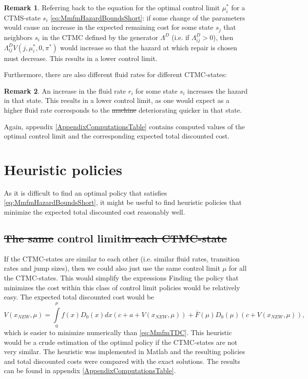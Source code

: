 \documentclass[a4paper]{thesis}
\theoremstyle{definition}
\newtheorem{remark}{Remark}[chapter]
\providecommand{\DIFaddtex}[1]{{\protect\color{blue}\uwave{#1}}} %
\providecommand{\DIFdeltex}[1]{{\protect\color{red}\sout{#1}}}                      %
\providecommand{\DIFaddbegin}{} %
\providecommand{\DIFaddend}{} %
\providecommand{\DIFdelbegin}{} %
\providecommand{\DIFdelend}{} %
\providecommand{\DIFadd}[1]{\texorpdfstring{\DIFaddtex{#1}}{#1}} %
\providecommand{\DIFdel}[1]{\texorpdfstring{\DIFdeltex{#1}}{}} %
\newcommand{\DIFscaledelfig}{0.5}
\newlength{\DIFdelgraphicswidth} %
\newlength{\DIFdelgraphicsheight} %
\newcommand{\DIFaddincludegraphics}[2][]{{\color{blue}\fbox{\DIFOincludegraphics[#1]{#2}}}} %
\newcommand{\DIFdelincludegraphics}[2][]{%
	\sbox{\DIFdelgraphicsbox}{\DIFOincludegraphics[#1]{#2}}%
	\settoboxwidth{\DIFdelgraphicswidth}{\DIFdelgraphicsbox} %
	\settoboxtotalheight{\DIFdelgraphicsheight}{\DIFdelgraphicsbox} %
	\scalebox{\DIFscaledelfig}{%
		\parbox[b]{\DIFdelgraphicswidth}{\usebox{\DIFdelgraphicsbox}\\[-\baselineskip] \rule{\DIFdelgraphicswidth}{0em}}\llap{\resizebox{\DIFdelgraphicswidth}{\DIFdelgraphicsheight}{%
				\setlength{\unitlength}{\DIFdelgraphicswidth}%
				\begin{picture}(1,1)%
				\thicklines\linethickness{2pt} %
				{\color[rgb]{1,0,0}\put(0,0){\framebox(1,1){}}}%
				{\color[rgb]{1,0,0}\put(0,0){\line( 1,1){1}}}%
				{\color[rgb]{1,0,0}\put(0,1){\line(1,-1){1}}}%
				\end{picture}%
			}\hspace*{3pt}}} %
} %
\DeclareRobustCommand{\DIFaddbegin}{\DIFOaddbegin \let\includegraphics\DIFaddincludegraphics} %
\DeclareRobustCommand{\DIFaddend}{\DIFOaddend \let\includegraphics\DIFOincludegraphics} %
\DeclareRobustCommand{\DIFdelbegin}{\DIFOdelbegin \let\includegraphics\DIFdelincludegraphics} %
\DeclareRobustCommand{\DIFdelend}{\DIFOaddend \let\includegraphics\DIFOincludegraphics} %
\begin{document}
	\begin{remark}
		Referring back to the equation for the optimal control limit $\mu_i^*$ for a CTMS-state $s_i$ \eqref{eq:MmfmHazardBoundsShort}: if some change of the parameters would cause an increase in the expected remaining cost for some state $s_j$ that neighbors $s_i$ in the CTMC defined by the generator $\Lambda^D$ (i.e. if $\Lambda^D_{ij}>0$), then $\Lambda^D_{ij}V(j,\mu_i^*,0,\pi^*)$ would increase so that the hazard at which repair is chosen must decrease.
		This results in a lower control limit.
	\end{remark}
	
	Furthermore, there are also different fluid rates for different CTMC-states:
	\begin{remark}
		An increase in the fluid rate $r_i$ for some state $s_i$ increases the hazard in that state.
		This results in a lower control limit, as one would expect as a higher fluid rate corresponds to the \DIFdelbegin \DIFdel{machine }\DIFdelend \DIFaddbegin \DIFadd{asset }\DIFaddend deteriorating quicker in that state.
	\end{remark}
	
	Again, appendix \ref{AppendixComputationsTable} contains computed values of the optimal control limit and the corresponding expected total discounted cost. \section{Heuristic policies}\DIFaddbegin \label{section:MmfmHeuristics}
	\DIFaddend As it is difficult to find an optimal policy that satisfies \eqref{eq:MmfmHazardBoundsShort}, it might be useful to find heuristic policies that minimize the expected total discounted cost reasonably well.
	
	\subsection{\DIFdelbegin \DIFdel{The same }\DIFdelend \DIFaddbegin \DIFadd{Uniform }\DIFaddend control limit\DIFdelbegin \DIFdel{in each CTMC-state}\DIFdelend }
	If the CTMC-states are similar to each other (i.e. similar fluid rates, transition rates and jump sizes), then we could also just use the same control limit $\mu$ for all the CTMC-states.
	This would simplify the expressions 
	Finding the policy that minimizes the cost within this class of control limit policies would be relatively easy.
	The expected total discounted cost would be
	\[
	V(x_{NEW},\mu)=\int\limits_0^\mu f(x)D_0(x)dx (c+a+V(x_{NEW},\mu))+\bar{F}(\mu)D_0(\mu)(c+V(x_{NEW},\mu)),
	\]
	which is easier to minimize numerically than \eqref{eq:MmfmTDC}.
	This heuristic would be a crude estimation of the optimal policy if the  CTMC-states are not very similar. 
	The heuristic was implemented in Matlab and the resulting policies and total discounted costs were compared with the exact solutions.
	The results can be found in appendix \ref{AppendixComputationsTable}.
	
\end{document}
